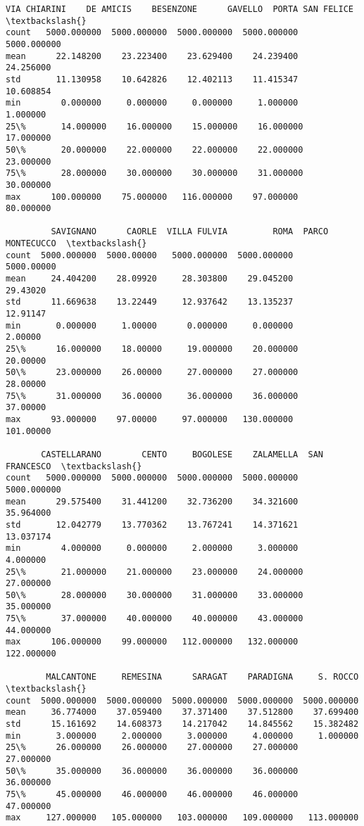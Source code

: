 \documentclass[11pt]{article}
\begin{document}
\begin{tcolorbox}[breakable, size=fbox, boxrule=.5pt, pad at break*=1mm, opacityfill=0]
\begin{Verbatim}[commandchars=\\\{\}]
       VIA CHIARINI    DE AMICIS    BESENZONE      GAVELLO  PORTA SAN FELICE  \textbackslash{}
count   5000.000000  5000.000000  5000.000000  5000.000000       5000.000000
mean      22.148200    23.223400    23.629400    24.239400         24.256000
std       11.130958    10.642826    12.402113    11.415347         10.608854
min        0.000000     0.000000     0.000000     1.000000          1.000000
25\%       14.000000    16.000000    15.000000    16.000000         17.000000
50\%       20.000000    22.000000    22.000000    22.000000         23.000000
75\%       28.000000    30.000000    30.000000    31.000000         30.000000
max      100.000000    75.000000   116.000000    97.000000         80.000000

         SAVIGNANO      CAORLE  VILLA FULVIA         ROMA  PARCO MONTECUCCO  \textbackslash{}
count  5000.000000  5000.00000   5000.000000  5000.000000        5000.00000
mean     24.404200    28.09920     28.303800    29.045200          29.43020
std      11.669638    13.22449     12.937642    13.135237          12.91147
min       0.000000     1.00000      0.000000     0.000000           2.00000
25\%      16.000000    18.00000     19.000000    20.000000          20.00000
50\%      23.000000    26.00000     27.000000    27.000000          28.00000
75\%      31.000000    36.00000     36.000000    36.000000          37.00000
max      93.000000    97.00000     97.000000   130.000000         101.00000

       CASTELLARANO        CENTO     BOGOLESE    ZALAMELLA  SAN FRANCESCO  \textbackslash{}
count   5000.000000  5000.000000  5000.000000  5000.000000    5000.000000
mean      29.575400    31.441200    32.736200    34.321600      35.964000
std       12.042779    13.770362    13.767241    14.371621      13.037174
min        4.000000     0.000000     2.000000     3.000000       4.000000
25\%       21.000000    21.000000    23.000000    24.000000      27.000000
50\%       28.000000    30.000000    31.000000    33.000000      35.000000
75\%       37.000000    40.000000    40.000000    43.000000      44.000000
max      106.000000    99.000000   112.000000   132.000000     122.000000

        MALCANTONE     REMESINA      SARAGAT    PARADIGNA     S. ROCCO  \textbackslash{}
count  5000.000000  5000.000000  5000.000000  5000.000000  5000.000000
mean     36.774000    37.059400    37.371400    37.512800    37.699400
std      15.161692    14.608373    14.217042    14.845562    15.382482
min       3.000000     2.000000     3.000000     4.000000     1.000000
25\%      26.000000    26.000000    27.000000    27.000000    27.000000
50\%      35.000000    36.000000    36.000000    36.000000    36.000000
75\%      45.000000    46.000000    46.000000    46.000000    47.000000
max     127.000000   105.000000   103.000000   109.000000   113.000000


\end{Verbatim}
\end{tcolorbox}
\end{document}
